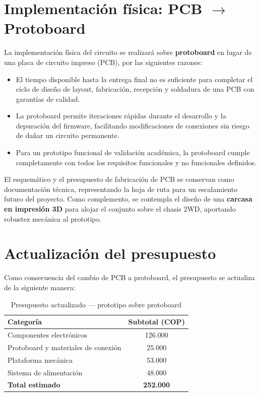 \documentclass[12pt]{report}
\begin{document}
\section{Implementación física: PCB $\rightarrow$ Protoboard}

La implementación física del circuito se realizará sobre \textbf{protoboard} en lugar de una placa de circuito impreso (PCB), por las siguientes razones:

\begin{itemize}
    \item El tiempo disponible hasta la entrega final no es suficiente para completar el ciclo de diseño de layout, fabricación, recepción y soldadura de una PCB con garantías de calidad.
    \item La protoboard permite iteraciones rápidas durante el desarrollo y la depuración del firmware, facilitando modificaciones de conexiones sin riesgo de dañar un circuito permanente.
    \item Para un prototipo funcional de validación académica, la protoboard cumple completamente con todos los requisitos funcionales y no funcionales definidos.
\end{itemize}

El esquemático y el presupuesto de fabricación de PCB se conservan como documentación técnica, representando la hoja de ruta para un escalamiento futuro del proyecto. Como complemento, se contempla el diseño de una \textbf{carcasa en impresión 3D} para alojar el conjunto sobre el chasis 2WD, aportando robustez mecánica al prototipo.

\section{Actualización del presupuesto}

Como consecuencia del cambio de PCB a protoboard, el presupuesto se actualiza de la siguiente manera:

\begin{table}[H]
\centering
\renewcommand{\arraystretch}{1.4}
\begin{tabular}{|l|c|}
\hline
\textbf{Categoría} & \textbf{Subtotal (COP)} \\
\hline
Componentes electrónicos & 126.000 \\
Protoboard y materiales de conexión & 25.000 \\
Plataforma mecánica & 53.000 \\
Sistema de alimentación & 48.000 \\
\hline
\textbf{Total estimado} & \textbf{252.000} \\
\hline
\end{tabular}
\caption{Presupuesto actualizado — prototipo sobre protoboard}
\end{table}
\end{document}
